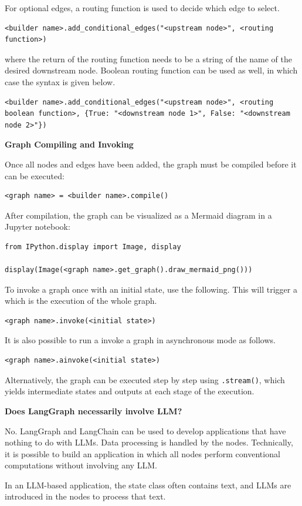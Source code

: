 For optional edges, a routing function is used to decide which edge to select.
\begin{lstlisting}
<builder name>.add_conditional_edges("<upstream node>", <routing function>)
\end{lstlisting}
where the return of the routing function needs to be a string of the name of the desired downstream node. Boolean routing function can be used as well, in which case the syntax is given below.
\begin{lstlisting}
<builder name>.add_conditional_edges("<upstream node>", <routing boolean function>, {True: "<downstream node 1>", False: "<downstream node 2>"})
\end{lstlisting}

\vspace{0.1in}
\noindent \textbf{Graph Compiling and Invoking}
\vspace{0.1in}

Once all nodes and edges have been added, the graph must be compiled before it can be executed:
\begin{lstlisting}
<graph name> = <builder name>.compile()
\end{lstlisting}

After compilation, the graph can be visualized as a Mermaid diagram in a Jupyter notebook:
\begin{lstlisting}
from IPython.display import Image, display

display(Image(<graph name>.get_graph().draw_mermaid_png()))
\end{lstlisting}

To invoke a graph once with an initial state, use the following. This will trigger a  which is the execution of the whole graph.
\begin{lstlisting}
<graph name>.invoke(<initial state>)
\end{lstlisting}
It is also possible to run a invoke a graph in asynchronous mode as follows.
\begin{lstlisting}
<graph name>.ainvoke(<initial state>)
\end{lstlisting}
Alternatively, the graph can be executed step by step using \verb|.stream()|, which yields intermediate states and outputs at each stage of the execution.

\begin{mdframed}
\textbf{Does LangGraph necessarily involve LLM?}

No. LangGraph and LangChain can be used to develop applications that have nothing to do with LLMs. Data processing is handled by the nodes. Technically, it is possible to build an application in which all nodes perform conventional computations without involving any LLM.

In an LLM-based application, the state class often contains text, and LLMs are introduced in the nodes to process that text.
\end{mdframed}

